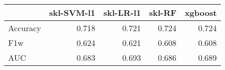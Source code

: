 \begin{tabular}{lrrrr}
\toprule
{} &  skl-SVM-l1 &  skl-LR-l1 &  skl-RF &  xgboost \\
\midrule
Accuracy &       0.718 &      0.721 &   0.724 &    0.724 \\
F1w      &       0.624 &      0.621 &   0.608 &    0.608 \\
AUC      &       0.683 &      0.693 &   0.686 &    0.689 \\
\bottomrule
\end{tabular}
